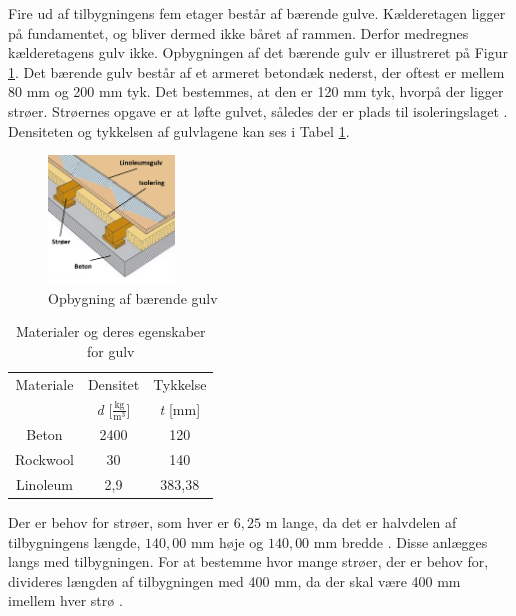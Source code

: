 Fire ud af tilbygningens fem etager består af bærende gulve. Kælderetagen ligger på fundamentet, og bliver dermed ikke båret af rammen. Derfor medregnes kælderetagens gulv ikke. 
\newline \indent{     }  Opbygningen af det bærende gulv er illustreret på Figur \ref{fig:gulv}. Det bærende gulv består af et armeret betondæk nederst, der oftest er mellem 80 mm og 200 mm tyk. Det bestemmes, at den er 120 mm tyk, hvorpå der ligger strøer. Strøernes opgave er at løfte gulvet, således der er plads til isoleringslaget \citep{Gulvopbygning}. Densiteten og tykkelsen af gulvlagene kan ses i Tabel \ref{tab:densi}.

\begin{figure}[H]
	\centering
	\includegraphics[width=0.3\textwidth]{billeder/gulv.png}
	\caption{Opbygning af bærende gulv}
	\label{fig:gulv}
\end{figure}

\begin{table}
	\begin{center}
		\begin{tabular}{c c c}
			\hline
			Materiale & Densitet & Tykkelse \\
			& \textit{d} [$\frac{\text{kg}}{\text{m}^3}$] & \textit{t} [mm] \\ \hline
			Beton    & 2400     & 120      \\ 
			Rockwool & 30       & 140      \\ 
			Linoleum & 2,9      & 383,38  \\ 
		\end{tabular}
		\caption{Materialer og deres egenskaber for gulv}
		\label{tab:densi}
	\end{center}
\end{table}

Der er behov for strøer, som hver er $6,\!25$ m lange, da det er halvdelen af tilbygningens længde, $140,\!00$ mm høje og $140,\!00$ mm bredde \citep{granse}. Disse anlægges langs med tilbygningen. For at bestemme hvor mange strøer, der er behov for, divideres længden af tilbygningen med 400 mm, da der skal være 400 mm imellem hver strø \citep{Gulvopbygning}. 

